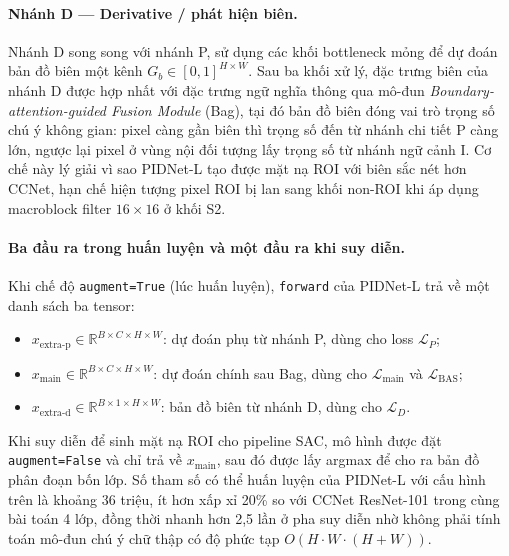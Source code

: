 \paragraph{Nhánh D --- Derivative / phát hiện biên.} Nhánh D song song với nhánh P, sử dụng các khối bottleneck mỏng để dự đoán bản đồ biên một kênh $G_b \in [0,1]^{H\times W}$. Sau ba khối xử lý, đặc trưng biên của nhánh D được hợp nhất với đặc trưng ngữ nghĩa thông qua mô-đun \textit{Boundary-attention-guided Fusion Module} (Bag), tại đó bản đồ biên đóng vai trò trọng số chú ý không gian: pixel càng gần biên thì trọng số đến từ nhánh chi tiết P càng lớn, ngược lại pixel ở vùng nội đối tượng lấy trọng số từ nhánh ngữ cảnh I. Cơ chế này lý giải vì sao PIDNet-L tạo được mặt nạ ROI với biên sắc nét hơn CCNet, hạn chế hiện tượng pixel ROI bị lan sang khối non-ROI khi áp dụng macroblock filter $16\times 16$ ở khối S2.

\paragraph{Ba đầu ra trong huấn luyện và một đầu ra khi suy diễn.} Khi chế độ \texttt{augment=True} (lúc huấn luyện), \texttt{forward} của PIDNet-L trả về một danh sách ba tensor:
\begin{itemize}
  \item $x_{\text{extra-p}} \in \mathbb{R}^{B\times C\times H\times W}$: dự đoán phụ từ nhánh P, dùng cho loss $\mathcal{L}_P$;
  \item $x_{\text{main}} \in \mathbb{R}^{B\times C\times H\times W}$: dự đoán chính sau Bag, dùng cho $\mathcal{L}_{\text{main}}$ và $\mathcal{L}_{\text{BAS}}$;
  \item $x_{\text{extra-d}} \in \mathbb{R}^{B\times 1\times H\times W}$: bản đồ biên từ nhánh D, dùng cho $\mathcal{L}_D$.
\end{itemize}
Khi suy diễn để sinh mặt nạ ROI cho pipeline SAC, mô hình được đặt \texttt{augment=False} và chỉ trả về $x_{\text{main}}$, sau đó được lấy argmax để cho ra bản đồ phân đoạn bốn lớp. Số tham số có thể huấn luyện của PIDNet-L với cấu hình trên là khoảng 36 triệu, ít hơn xấp xỉ 20\% so với CCNet ResNet-101 trong cùng bài toán 4 lớp, đồng thời nhanh hơn 2,5 lần ở pha suy diễn nhờ không phải tính toán mô-đun chú ý chữ thập có độ phức tạp $O(H\cdot W\cdot(H+W))$.
 


 
